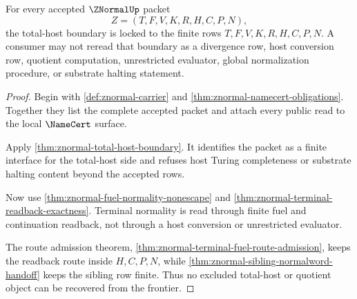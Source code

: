 \begin{theorem}
\label{thm:znormal-total-host-frontier-lock}
For every accepted $\ZNormalUp$ packet
$$
Z=(T,F,V,K,R,H,C,P,N),
$$
the total-host boundary is locked to the finite rows
$T,F,V,K,R,H,C,P,N$. A consumer may not reread that boundary as a divergence
row, host conversion row, quotient computation, unrestricted evaluator,
global normalization procedure, or substrate halting statement.
\end{theorem}
\begin{proof}
Begin with \autoref{def:znormal-carrier} and
\autoref{thm:znormal-namecert-obligations}. Together they list the complete
accepted packet and attach every public read to the local $\NameCert$ surface.

Apply \autoref{thm:znormal-total-host-boundary}. It identifies the packet as a
finite interface for the total-host side and refuses host Turing completeness
or substrate halting content beyond the accepted rows.

Now use \autoref{thm:znormal-fuel-normality-nonescape} and
\autoref{thm:znormal-terminal-readback-exactness}. Terminal normality is read
through finite fuel and continuation readback, not through a host conversion or
unrestricted evaluator.

The route admission theorem,
\autoref{thm:znormal-terminal-fuel-route-admission}, keeps the readback route
inside $H,C,P,N$, while
\autoref{thm:znormal-sibling-normalword-handoff} keeps the sibling row finite.
Thus no excluded total-host or quotient object can be recovered from the
frontier.
\end{proof}

